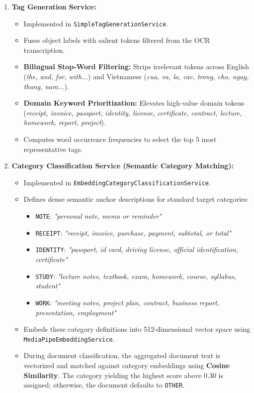 \begin{enumerate}[label=\textbf{4.1.\arabic*.}]
    \item \textbf{Tag Generation Service:}
    \begin{itemize}
        \item Implemented in \texttt{SimpleTagGenerationService}.
        \item Fuses object labels with salient tokens filtered from the OCR transcription.
        \item \textbf{Bilingual Stop-Word Filtering:} Strips irrelevant tokens across English (\textit{the, and, for, with...}) and Vietnamese (\textit{cua, va, la, cac, trong, cho, ngay, thang, nam...}).
        \item \textbf{Domain Keyword Prioritization:} Elevates high-value domain tokens (\textit{receipt, invoice, passport, identity, license, certificate, contract, lecture, homework, report, project}).
        \item Computes word occurrence frequencies to select the top 5 most representative tags.
    \end{itemize}

    \item \textbf{Category Classification Service (Semantic Category Matching):}
    \begin{itemize}
        \item Implemented in \texttt{EmbeddingCategoryClassificationService}.
        \item Defines dense semantic anchor descriptions for standard target categories:
        \begin{itemize}
            \item \texttt{NOTE}: \textit{"personal note, memo or reminder"}
            \item \texttt{RECEIPT}: \textit{"receipt, invoice, purchase, payment, subtotal, or total"}
            \item \texttt{IDENTITY}: \textit{"passport, id card, driving license, official identification, certificate"}
            \item \texttt{STUDY}: \textit{"lecture notes, textbook, exam, homework, course, syllabus, student"}
            \item \texttt{WORK}: \textit{"meeting notes, project plan, contract, business report, presentation, employment"}
        \end{itemize}
        \item Embeds these category definitions into 512-dimensional vector space using \texttt{MediaPipeEmbeddingService}.
        \item During document classification, the aggregated document text is vectorized and matched against category embeddings using \textbf{Cosine Similarity}. The category yielding the highest score above $0.30$ is assigned; otherwise, the document defaults to \texttt{OTHER}.
    \end{itemize}
\end{enumerate}


